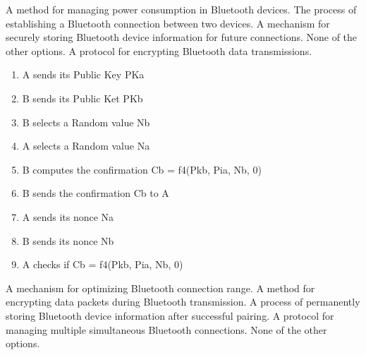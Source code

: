\begin{checkboxes}
    \choice A method for managing power consumption in Bluetooth devices.
    \CorrectChoice The process of establishing a Bluetooth connection between two devices.
    \choice A mechanism for securely storing Bluetooth device information for future connections.
    \choice None of the other options.
    \choice A protocol for encrypting Bluetooth data transmissions.
\end{checkboxes}


\begin{solution}
    \begin{enumerate}
        \item A sends its Public Key PKa
        \item B sends its Public Ket PKb
        \item B selects a Random value Nb
        \item A selects a Random value Na
        \item B computes the confirmation Cb = f4(Pkb, Pia, Nb, 0)
        \item B sends the confirmation Cb to A
        \item A sends its nonce Na
        \item B sends its nonce Nb
        \item A checks if Cb = f4(Pkb, Pia, Nb, 0)
    \end{enumerate}
\end{solution}

\begin{checkboxes}
    \choice A mechanism for optimizing Bluetooth connection range.
    \choice A method for encrypting data packets during Bluetooth transmission.
    \CorrectChoice A process of permanently storing Bluetooth device information after successful pairing.
    \choice A protocol for managing multiple simultaneous Bluetooth connections.
    \choice None of the other options.
\end{checkboxes}
